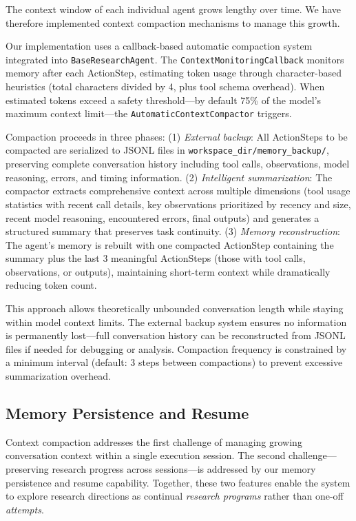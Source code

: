 \documentclass{article}
\begin{document}
The context window of each individual agent grows lengthy over time. We have therefore implemented context compaction mechanisms to manage this growth.

Our implementation uses a callback-based automatic compaction system integrated into \texttt{BaseResearchAgent}. The \texttt{ContextMonitoringCallback} monitors memory after each ActionStep, estimating token usage through character-based heuristics (total characters divided by 4, plus tool schema overhead). When estimated tokens exceed a safety threshold---by default 75\% of the model's maximum context limit---the \texttt{AutomaticContextCompactor} triggers.

Compaction proceeds in three phases: (1) \textit{External backup}: All ActionSteps to be compacted are serialized to JSONL files in \texttt{workspace\_dir/memory\_backup/}, preserving complete conversation history including tool calls, observations, model reasoning, errors, and timing information. (2) \textit{Intelligent summarization}: The compactor extracts comprehensive context across multiple dimensions (tool usage statistics with recent call details, key observations prioritized by recency and size, recent model reasoning, encountered errors, final outputs) and generates a structured summary that preserves task continuity. (3) \textit{Memory reconstruction}: The agent's memory is rebuilt with one compacted ActionStep containing the summary plus the last 3 meaningful ActionSteps (those with tool calls, observations, or outputs), maintaining short-term context while dramatically reducing token count.

This approach allows theoretically unbounded conversation length while staying within model context limits. The external backup system ensures no information is permanently lost---full conversation history can be reconstructed from JSONL files if needed for debugging or analysis. Compaction frequency is constrained by a minimum interval (default: 3 steps between compactions) to prevent excessive summarization overhead.

\subsection*{Memory Persistence and Resume}
Context compaction addresses the first challenge of managing growing conversation context within a single execution session. The second challenge---preserving research progress across sessions---is addressed by our memory persistence and resume capability. Together, these two features enable the system to explore research directions as continual \emph{research programs} rather than one-off \emph{attempts}.
\end{document}
